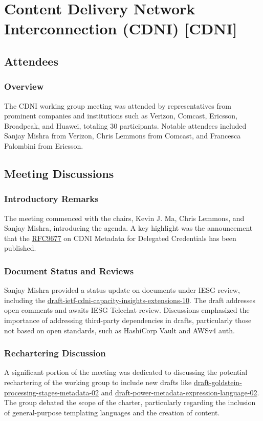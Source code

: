 \documentclass{article}
\begin{document}
\newpage

\section{Content Delivery Network Interconnection (CDNI) [CDNI]}

\subsection{Attendees}
\subsubsection{Overview}
The CDNI working group meeting was attended by representatives from prominent companies and institutions such as Verizon, Comcast, Ericsson, Broadpeak, and Huawei, totaling 30 participants. Notable attendees included Sanjay Mishra from Verizon, Chris Lemmons from Comcast, and Francesca Palombini from Ericsson.

\subsection{Meeting Discussions}

\subsubsection{Introductory Remarks}
The meeting commenced with the chairs, Kevin J. Ma, Chris Lemmons, and Sanjay Mishra, introducing the agenda. A key highlight was the announcement that the \href{https://datatracker.ietf.org/doc/html/rfc9677}{RFC9677} on CDNI Metadata for Delegated Credentials has been published.

\subsubsection{Document Status and Reviews}
Sanjay Mishra provided a status update on documents under IESG review, including the \href{https://datatracker.ietf.org/doc/html/draft-ietf-cdni-capacity-insights-extensions-10}{draft-ietf-cdni-capacity-insights-extensions-10}. The draft addresses open comments and awaits IESG Telechat review. Discussions emphasized the importance of addressing third-party dependencies in drafts, particularly those not based on open standards, such as HashiCorp Vault and AWSv4 auth.

\subsubsection{Rechartering Discussion}
A significant portion of the meeting was dedicated to discussing the potential rechartering of the working group to include new drafts like \href{https://datatracker.ietf.org/doc/html/draft-goldstein-processing-stages-metadata-02}{draft-goldstein-processing-stages-metadata-02} and \href{https://datatracker.ietf.org/doc/html/draft-power-metadata-expression-language-02}{draft-power-metadata-expression-language-02}. The group debated the scope of the charter, particularly regarding the inclusion of general-purpose templating languages and the creation of content.
\end{document}
